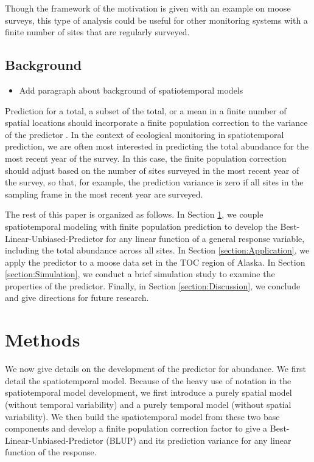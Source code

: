 \documentclass[]{interact}
\theoremstyle{plain}%
\theoremstyle{definition}
\theoremstyle{remark}
\providecommand{\tightlist}{%
  \setlength{\itemsep}{0pt}\setlength{\parskip}{0pt}}
\def\tightlist{}
\begin{document}
Though the framework of the motivation is given with an example on moose
surveys, this type of analysis could be useful for other monitoring
systems with a finite number of sites that are regularly surveyed.

\subsection{Background}

\begin{itemize}
\tightlist
\item
  Add paragraph about background of spatiotemporal models
\end{itemize}

Prediction for a total, a subset of the total, or a mean in a finite
number of spatial locations should incorporate a finite population
correction to the variance of the predictor
\citep{ver2008spatial, higham2021adjusting}. In the context of
ecological monitoring in spatiotemporal prediction, we are often most
interested in predicting the total abundance for the most recent year of
the survey. In this case, the finite population correction should adjust
based on the number of sites surveyed in the most recent year of the
survey, so that, for example, the prediction variance is zero if all
sites in the sampling frame in the most recent year are surveyed.

The rest of this paper is organized as follows. In Section
\ref{section:Methods}, we couple spatiotemporal modeling with finite
population prediction to develop the Best-Linear-Unbiased-Predictor for
any linear function of a general response variable, including the total
abundance across all sites. In Section \ref{section:Application}, we
apply the predictor to a moose data set in the TOC region of Alaska. In
Section \ref{section:Simulation}, we conduct a brief simulation study to
examine the properties of the predictor. Finally, in Section
\ref{section:Discussion}, we conclude and give directions for future
research.

\section{Methods} \label{section:Methods}

We now give details on the development of the predictor for abundance.
We first detail the spatiotemporal model. Because of the heavy use of
notation in the spatiotemporal model development, we first introduce a
purely spatial model (without temporal variability) and a purely
temporal model (without spatial variability). We then build the
spatiotemporal model from these two base components and develop a finite
population correction factor to give a Best-Linear-Unbiased-Predictor
(BLUP) and its prediction variance for any linear function of the
response.
\end{document}
